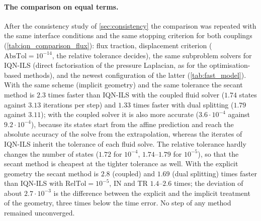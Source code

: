 \documentclass[11pt,a4paper]{article}
\theoremstyle{definition}
\theoremstyle{remark}
\begin{document}
\paragraph{The comparison on equal terms.} After the consistency study of \cref{sec:consistency}
the comparison was repeated with the same interface conditions and the same stopping criterion for
both couplings (\cref{tab:iqn_comparison_flux}): flux traction, displacement criterion
($\mathrm{AbsTol}=10^{-14}$, the relative tolerance decides), the same subproblem solvers for
IQN-ILS (direct factorisation of the pressure Laplacian, as for the optimisation-based methods), and
the newest configuration of the latter (\cref{tab:fast_model}). With the same scheme (implicit
geometry) and the same tolerance the secant method is $2.3$ times faster than IQN-ILS with the
coupled fluid solver ($1.74$ states against $3.13$ iterations per step) and $1.33$ times faster with
dual splitting ($1.79$ against $3.11$); with the coupled solver it is also more accurate
($3.6\cdot10^{-4}$ against $9.2\cdot10^{-4}$), because its states start from the affine
prediction and reach the absolute accuracy of the solve from the extrapolation, whereas the
iterates of IQN-ILS inherit the tolerance of each fluid solve. The relative tolerance hardly
changes the number of states ($1.72$ for $10^{-4}$, $1.74$--$1.79$ for $10^{-5}$), so that the
secant method is cheapest at the tighter tolerance as well. With the explicit geometry the secant
method is $2.8$ (coupled) and $1.69$ (dual splitting) times faster than IQN-ILS with
$\mathrm{RelTol}=10^{-5}$, IN and TR $1.4$--$2.6$ times; the deviation of about $2.7\cdot10^{-3}$
is the difference between the explicit and the implicit treatment of the geometry, three times
below the time error. No step of any method remained unconverged.
\end{document}
